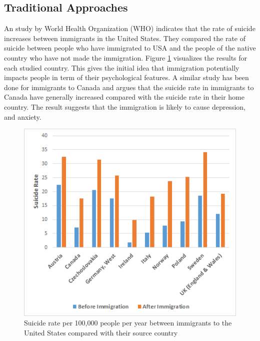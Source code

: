 \documentclass{article}
\begin{document}
\subsection{Traditional Approaches}

An study by World Health Organization (WHO) \cite{who} indicates that the rate of suicide increases between immigrants in the United States. They compared the rate of suicide between people who have immigrated to USA and the people of the native country who have not made the immigration. Figure \ref{suicide-rate} visualizes the results for each studied country. This gives the initial idea that immigration potentially impacts people in term of their psychological features. A similar study \cite{ref3} has been done for immigrants to Canada and argues that the suicide rate in immigrants to Canada have generally increased compared with the suicide rate in their home country. The result suggests that the immigration is likely to cause depression, and anxiety.

\begin{figure}[ht]
\vskip 0.2in
\begin{center}
\centerline{\includegraphics[width=\columnwidth]{Figures/suicide_rate.PNG}}
\caption{Suicide rate per 100,000 people per year between immigrants to the United States compared with their source country}
\label{suicide-rate}
\end{center}
\vskip -0.2in
\end{figure} 
\end{document}
